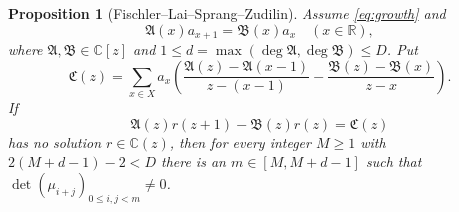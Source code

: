 \documentclass[11pt]{article}
\newtheorem{proposition}[theorem]{Proposition}
\theoremstyle{remark}
\newcommand{\R}{\mathbb R}
\newcommand{\C}{\mathbb C}
\numberwithin{equation}{section}
\begin{document}
\begin{proposition}[Fischler--Lai--Sprang--Zudilin]\label{prop:signed}
Assume \eqref{eq:growth} and
\begin{equation}\label{eq:weight-recurrence}
 \mathfrak A(x)a_{x+1}=\mathfrak B(x)a_x\quad(x\in\R),
\end{equation}
where $\mathfrak A,\mathfrak B\in\C[z]$ and
$1\leq d=\max(\deg\mathfrak A,\deg\mathfrak B)\leq D$. Put
\begin{equation}\label{eq:C-polynomial}
 \mathfrak C(z)=\sum_{x\in X}a_x
 \left(\frac{\mathfrak A(z)-\mathfrak A(x-1)}{z-(x-1)}
       -\frac{\mathfrak B(z)-\mathfrak B(x)}{z-x}\right).
\end{equation}
If
\begin{equation}\label{eq:rational-equation}
 \mathfrak A(z)r(z+1)-\mathfrak B(z)r(z)=\mathfrak C(z)
\end{equation}
has no solution $r\in\C(z)$, then for every integer $M\geq1$ with
$2(M+d-1)-2<D$ there is an $m\in[M,M+d-1]$ such that
$\det(\mu_{i+j})_{0\leq i,j<m}\ne0$.
\end{proposition}
\end{document}
